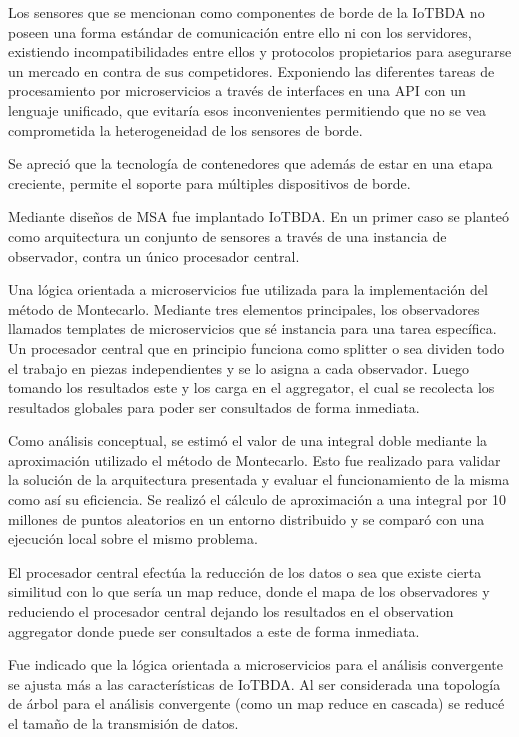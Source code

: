 Los sensores que se mencionan como componentes de borde de la IoTBDA no poseen una forma estándar de comunicación entre ello ni con los servidores, existiendo incompatibilidades entre ellos y protocolos propietarios para asegurarse un mercado en contra de sus competidores. Exponiendo las diferentes tareas de procesamiento por microservicios a través de  interfaces en una API con un lenguaje unificado, que evitaría esos inconvenientes permitiendo que no se vea comprometida la heterogeneidad de los sensores de borde.


Se apreció que la tecnología de contenedores que además de estar  en una etapa creciente, permite el soporte para múltiples dispositivos de borde.


Mediante diseños de MSA fue implantado IoTBDA. En un primer caso se planteó como arquitectura un conjunto de sensores a través de una instancia de observador, contra un único procesador central. 


Una lógica orientada a microservicios fue utilizada para la implementación del método de Montecarlo. Mediante tres elementos principales, los observadores llamados templates de microservicios que sé instancia para una tarea específica. 
Un procesador central que en principio funciona como splitter o sea dividen todo el trabajo en piezas independientes y se lo asigna a cada observador. Luego tomando los resultados este y los carga en el aggregator, el cual se recolecta los resultados globales para poder ser consultados de forma inmediata. 

Como análisis conceptual, se estimó el valor de una integral doble mediante la aproximación utilizado el método de Montecarlo. Esto fue realizado para validar la solución de la arquitectura presentada y evaluar el funcionamiento de la misma como así su eficiencia. Se realizó el cálculo de aproximación a una integral por 10 millones de puntos aleatorios en un entorno distribuido y se comparó con una ejecución local sobre el mismo problema. 

El procesador central efectúa la reducción de los datos o sea que existe cierta similitud con lo que sería un map reduce, donde el mapa de los observadores y reduciendo el procesador central dejando los resultados en el observation aggregator donde puede ser consultados a este de forma inmediata.

Fue indicado que la lógica orientada a microservicios para el análisis convergente se ajusta más a las características de IoTBDA. Al ser considerada una topología de árbol para el análisis convergente (como un map reduce en cascada) se reducé el tamaño de la transmisión de datos. 

